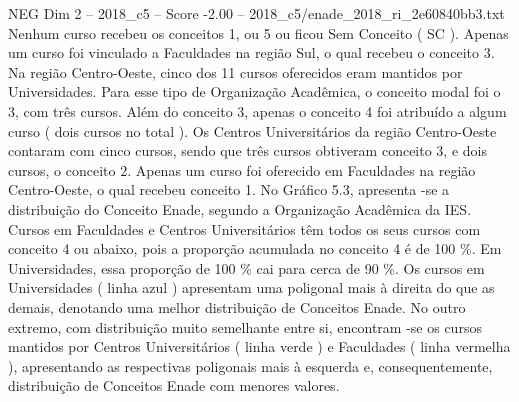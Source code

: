 \begin{textsample}{NEG Dim 2 – 2018\_c5 – Score -2.00 – 2018\_c5/enade\_2018\_ri\_2e60840bb3.txt}
Nenhum curso recebeu os conceitos 1, ou 5 ou ficou Sem Conceito ( SC ).
Apenas um curso foi vinculado a Faculdades na região Sul, o qual recebeu o conceito 3.
Na região Centro-Oeste, cinco dos 11 cursos oferecidos eram mantidos por Universidades.
Para esse tipo de Organização Acadêmica, o conceito modal foi o 3, com três cursos.
Além do conceito 3, apenas o conceito 4 foi atribuído a algum curso ( dois cursos no total ).
Os Centros Universitários da região Centro-Oeste contaram com cinco cursos, sendo que três cursos obtiveram conceito 3, e dois cursos, o conceito 2.
Apenas um curso foi oferecido em Faculdades na região Centro-Oeste, o qual recebeu conceito 1.
No Gráfico 5.3, apresenta -se a distribuição do Conceito Enade, segundo a Organização Acadêmica da IES.
Cursos em Faculdades e Centros Universitários têm todos os seus cursos com conceito 4 ou abaixo, pois a proporção acumulada no conceito 4 é de 100 \%.
Em Universidades, essa proporção de 100 \% cai para cerca de 90 \%.
Os cursos em Universidades ( linha azul ) apresentam uma poligonal mais à direita do que as demais, denotando uma melhor distribuição de Conceitos Enade.
No outro extremo, com distribuição muito semelhante entre si, encontram -se os cursos mantidos por Centros Universitários ( linha verde ) e Faculdades ( linha vermelha ), apresentando as respectivas poligonais mais à esquerda e, consequentemente, distribuição de Conceitos Enade com menores valores.

\end{textsample}
